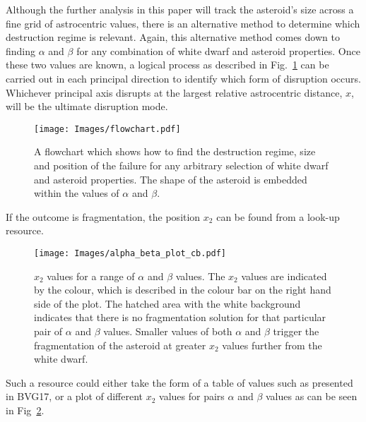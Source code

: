 \documentclass[fleqn,usenatbib]{mnras}
\begin{document}
Although the further analysis in this paper will track the asteroid's size across a fine grid of astrocentric values, there is an alternative method to determine which destruction regime is relevant.
Again, this alternative method comes down to finding $\alpha$ and $\beta$ for any combination of white dwarf and asteroid properties.
Once these two values are known, a logical process as described in Fig.~\ref{fig:flowchart} can be carried out in each principal direction to identify which form of disruption occurs.
Whichever principal axis disrupts at the largest relative astrocentric distance, $x$, will be the ultimate disruption mode.
\begin{figure} %
	\texttt{[image: Images/flowchart.pdf]}
    \caption{A flowchart which shows how to find the destruction regime, size and position of the failure for any arbitrary selection of white dwarf and asteroid properties. The shape of the asteroid is embedded within the values of $\alpha$ and $\beta$.}
    \label{fig:flowchart}
\end{figure}
If the outcome is fragmentation, the position $x_2$ can be found from a look-up resource.
\begin{figure} %
	\texttt{[image: Images/alpha\_beta\_plot\_cb.pdf]}
    \caption{$x_2$ values for a range of $\alpha$ and $\beta$ values. The $x_2$ values are indicated by the colour, which is described in the colour bar on the right hand side of the plot.
    The hatched area with the white background indicates that there is no fragmentation solution for that particular pair of $\alpha$ and $\beta$ values. 
    Smaller values of both $\alpha$ and $\beta$ trigger the fragmentation of the asteroid at greater $x_2$ values further from the white dwarf.}
    \label{fig:ab_pairs}
\end{figure}
Such a resource could either take the form of a table of values such as presented in BVG17, or a plot of different $x_2$ values for pairs $\alpha$ and $\beta$ values as can be seen in Fig~\ref{fig:ab_pairs}.




\bsp	%
\label{lastpage}
\end{document}
